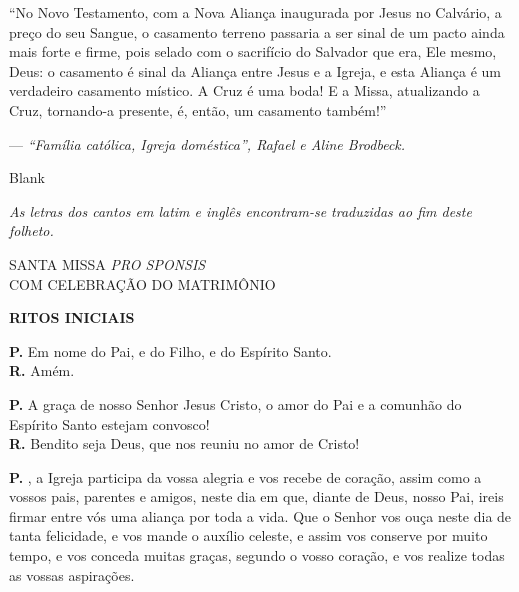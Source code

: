 \documentclass[a5paper,9pt]{memoir}
\begin{document}
\thispagestyle{empty}

\noindent ``No Novo Testamento, com a Nova Aliança inaugurada por Jesus no Calv\'a\-rio, a preço do seu Sangue, o casamento terreno passaria a ser sinal de um pacto ainda mais forte e firme, pois selado com o sacrifício do Salvador que era, Ele mesmo, Deus: o casamento é sinal da Aliança entre Jesus e a Igreja, e esta Aliança é um verdadeiro casamento místico. A Cruz é uma boda! E a Missa, atualizando a Cruz, tornando-a presente, é, então, um casamento também!''

\vspace{0.5cm}
\hfill --- \emph{``Família católica, Igreja doméstica'', Rafael e Aline Brodbeck.}

\pagebreak

{\color{white}Blank}
\thispagestyle{empty}
\vfill
\begin{center}
\begin{minipage}{0.76\linewidth}
\centering
\emph{As letras dos cantos em latim e ingl\^es encontram-se traduzidas ao fim deste folheto.}
\end{minipage}
\end{center}

\pagebreak

\begin{center}
SANTA MISSA \emph{PRO SPONSIS} \\ {\large COM CELEBRAÇÃO DO MATRIMÔNIO}
\end{center}

\begin{center}
\bfseries
RITOS INICIAIS
\end{center}

\textbf{P.} Em nome do Pai, e do Filho, e do Espírito Santo.\\
\textbf{R.} Amém.

\textbf{P.} A graça de nosso Senhor Jesus Cristo, o amor do Pai e a comunhão do Espírito Santo estejam convosco!\\
\textbf{R.} Bendito seja Deus, que nos reuniu no amor de Cristo!

\textbf{P.} \BG, a Igreja participa da vossa alegria e vos recebe de cora\c c\~ao, assim como a vossos pais, parentes e amigos, neste dia em que, diante de Deus, nosso Pai, ireis firmar entre v\'os uma alian\c ca por toda a vida. Que o Senhor vos ou\c ca neste dia de tanta felicidade, e vos mande o aux\'ilio celeste, e assim vos conserve por muito tempo, e vos conceda muitas gra\c cas, segundo o vosso cora\c c\~ao, e vos realize todas as vossas aspira\c c\~oes.
\end{document}
